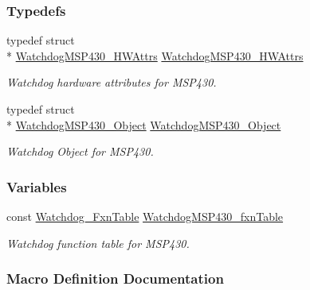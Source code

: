 \subsubsection*{Typedefs}
\begin{DoxyCompactItemize}
\item 
typedef struct \\*
\hyperlink{struct_watchdog_m_s_p430___h_w_attrs}{Watchdog\-M\-S\-P430\-\_\-\-H\-W\-Attrs} \hyperlink{_watchdog_m_s_p430_8h_af63bbbf564e9c87866b479a863d641b0}{Watchdog\-M\-S\-P430\-\_\-\-H\-W\-Attrs}
\begin{DoxyCompactList}\small\item\em Watchdog hardware attributes for M\-S\-P430. \end{DoxyCompactList}\item 
typedef struct \\*
\hyperlink{struct_watchdog_m_s_p430___object}{Watchdog\-M\-S\-P430\-\_\-\-Object} \hyperlink{_watchdog_m_s_p430_8h_a4a9f55d973176fc4959cd62a5e8a1871}{Watchdog\-M\-S\-P430\-\_\-\-Object}
\begin{DoxyCompactList}\small\item\em Watchdog Object for M\-S\-P430. \end{DoxyCompactList}\end{DoxyCompactItemize}
\subsubsection*{Variables}
\begin{DoxyCompactItemize}
\item 
const \hyperlink{struct_watchdog___fxn_table}{Watchdog\-\_\-\-Fxn\-Table} \hyperlink{_watchdog_m_s_p430_8h_ad70837d4fca74e7271df9b79a7dc3092}{Watchdog\-M\-S\-P430\-\_\-fxn\-Table}
\begin{DoxyCompactList}\small\item\em Watchdog function table for M\-S\-P430. \end{DoxyCompactList}\end{DoxyCompactItemize}


\subsubsection{Macro Definition Documentation}
